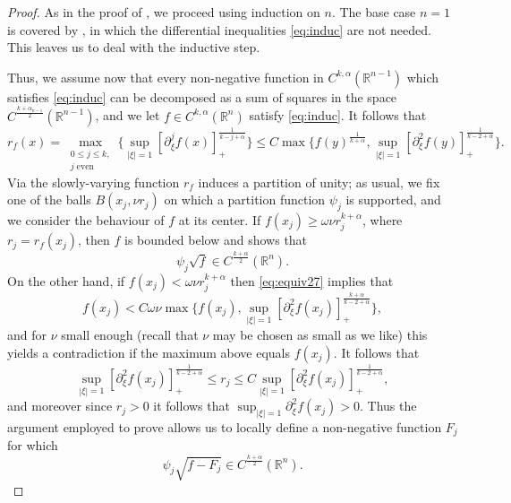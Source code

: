 \documentclass[oneside,hidelinks,indentfirst,10pt]{book}
\begin{document}
\begin{proof}
As in the proof of , we proceed using induction on \(n\). The base case \(n=1\) is covered by , in which the differential inequalities \eqref{eq:induc} are not needed. This leaves us to deal with the inductive step. 


Thus, we assume now that every non-negative function in \(C^{k,\alpha}(\mathbb{R}^{n-1})\) which satisfies \eqref{eq:induc} can be decomposed as a sum of squares in the space \(C^\frac{k+\alpha_{n-1}}{2}(\mathbb{R}^{n-1})\), and we let \(f\in C^{k,\alpha}(\mathbb{R}^n)\) satisfy \eqref{eq:induc}. It follows that
\begin{equation}\label{eq:equiv27}
    r_f(x)=\max_{\substack{0\leq j\leq k,\\j\;\mathrm{even}}}\bigg\{\sup_{|\xi|=1}[\partial^j_\xi f(x)]_+^\frac{1}{k-j+\alpha}\bigg\}\leq C\max\bigg\{f(y)^\frac{1}{k+\alpha},\sup_{|\xi|=1}[\partial^2_\xi f(y)]_+^\frac{1}{k-2+\alpha}\bigg\}.
\end{equation}
Via  the slowly-varying function \(r_f\) induces a partition of unity; as usual, we fix one of the balls \(B(x_j,\nu r_j)\) on which a partition function \(\psi_j\) is supported, and we consider the behaviour of \(f\) at its center. If \(f(x_j)\geq \omega\nu r_j^{k+\alpha}\), where \(r_j=r_f(x_j)\), then \(f\) is bounded below and  shows that 
\[
    \psi_j\sqrt{f}\in C^\frac{k+\alpha}{2}(\mathbb{R}^n).
\]
On the other hand, if \(f(x_j)< \omega\nu r_j^{k+\alpha}\) then \eqref{eq:equiv27} implies that
\[
    f(x_j)< C\omega\nu \max\bigg\{f(x_j),\sup_{|\xi|=1}[\partial^2_\xi f(x_j)]_+^\frac{k+\alpha}{k-2+\alpha}\bigg\},
\]
and for \(\nu\) small enough (recall that \(\nu\) may be chosen as small as we like) this yields a contradiction if the maximum above equals \(f(x_j)\). It follows that 
\[
    \sup_{|\xi|=1}[\partial^2_\xi f(x_j)]_+^\frac{1}{k-2+\alpha}\leq r_j\leq C\sup_{|\xi|=1}[\partial^2_\xi f(x_j)]_+^\frac{1}{k-2+\alpha},
\]
and moreover since \(r_j>0\) it follows that \(\sup_{|\xi|=1}\partial^2_\xi f(x_j)>0\). Thus the argument employed to prove  allows us to locally define a non-negative function \(F_j\) for which 
\[
    \psi_j\sqrt{f-F_j}\in C^\frac{k+\alpha}{2}(\mathbb{R}^n).
\]


\end{proof}
\end{document}
